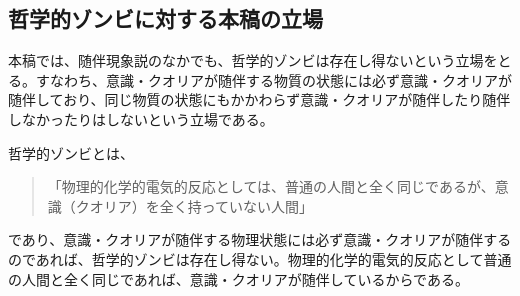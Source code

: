 \subsection{哲学的ゾンビに対する本稿の立場}
本稿では、随伴現象説のなかでも、哲学的ゾンビは存在し得ないという立場をとる。すなわち、意識・クオリアが随伴する物質の状態には必ず意識・クオリアが随伴しており、同じ物質の状態にもかかわらず意識・クオリアが随伴したり随伴しなかったりはしないという立場である。\par
哲学的ゾンビとは、
\begin{quotation}
「物理的化学的電気的反応としては、普通の人間と全く同じであるが、意識（クオリア）を全く持っていない人間」\cite{wikipediab}
\end{quotation}
であり、意識・クオリアが随伴する物理状態には必ず意識・クオリアが随伴するのであれば、哲学的ゾンビは存在し得ない。物理的化学的電気的反応として普通の人間と全く同じであれば、意識・クオリアが随伴しているからである。